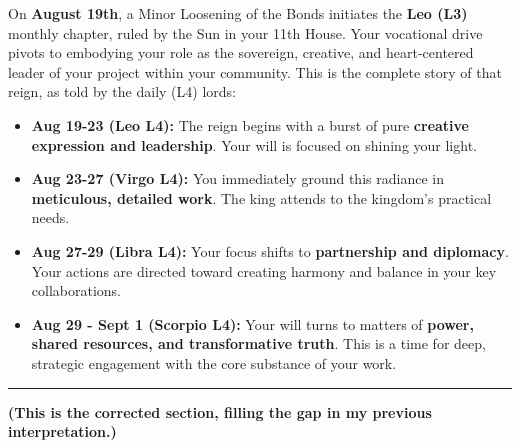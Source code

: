 \documentclass{article}
\begin{document}
On \textbf{August 19th}, a Minor Loosening of the Bonds initiates the \textbf{Leo (L3)} monthly chapter, ruled by the Sun in your 11th House. Your vocational drive pivots to embodying your role as the sovereign, creative, and heart-centered leader of your project within your community. This is the complete story of that reign, as told by the daily (L4) lords:

\begin{itemize}
\item
  \textbf{Aug 19-23 (Leo L4):} The reign begins with a burst of pure \textbf{creative expression and leadership}. Your will is focused on shining your light.
\item
  \textbf{Aug 23-27 (Virgo L4):} You immediately ground this radiance in \textbf{meticulous, detailed work}. The king attends to the kingdom's practical needs.
\item
  \textbf{Aug 27-29 (Libra L4):} Your focus shifts to \textbf{partnership and diplomacy}. Your actions are directed toward creating harmony and balance in your key collaborations.
\item
  \textbf{Aug 29 - Sept 1 (Scorpio L4):} Your will turns to matters of \textbf{power, shared resources, and transformative truth}. This is a time for deep, strategic engagement with the core substance of your work.
\end{itemize}

\begin{center}\rule{0.5\linewidth}{0.5pt}\end{center}

\textbf{(This is the corrected section, filling the gap in my previous interpretation.)}
\end{document}
